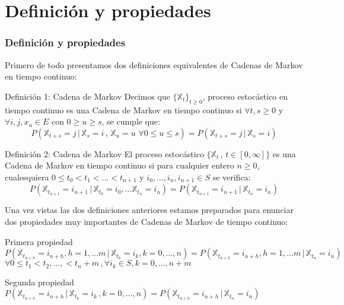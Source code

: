 \documentclass{beamer}
\begin{document}
\section{Definición y propiedades}
\begin{frame}
    \frametitle{Definición y propiedades}
    Primero de todo presentamos dos definiciones equivalentes de Cadenas de Markov en tiempo continuo:
    \newline
    \begin{block}{Definición 1: Cadena de Markov}
Decimos que $\{\mathbb{X}_t\}_{t\geq 0}$, proceso estocástico en tiempo continuo es una Cadena de Markov en tiempo continuo si $\forall t,s\geq 0$ y $\forall i,j,x_u\in E$ con $0\geq u \geq s$, se cumple que:
$$P(\mathbb{X}_{t+s}=j \, | \, \mathbb{X}_s =i \, , \,  \mathbb{X}_u =  u \,\, \forall 0\leq u\leq s)=P(\mathbb{X}_{t+s}=j \, | \, \mathbb{X}_s = i)$$
    \end{block}

\end{frame}
\begin{frame}
    \begin{block}{Definición 2: Cadena de Markov}
    El proceso estocástico $\{\mathbb{X}_t \, , \, t\in [0,\infty]\}$ es una Cadena de Markov en tiempo continuo si para cualquier entero $n\geq 0$, cualesquiera $0\leq t_0 < t_1 < \ldots < t_{n+1}$ y $i_0,\ldots , i_n,i_{n+1}\in S$ se verifica:
$$P(\mathbb{X}_{t_{n+1}}=i_{n+1}\, | \, \mathbb{X}_{t_0}=i_0 , \ldots \mathbb{X}_{t_n}=i_n)=P(\mathbb{X}_{t_{n+1}}=i_{n+1}\, | \, \mathbb{X}_{t_n}=i_n)$$
    \end{block}
\end{frame}

\begin{frame}
Una vez vistas las dos definiciones anteriores estamos preparados para enunciar dos propiedades muy importantes de Cadenas de Markov de tiempo continuo:
\begin{block}{Primera propiedad}
$P(\mathbb{X}_{t_{n+h}}=i_{n+h}, h=1,\ldots m \, | \, \mathbb{X}_{t_k}=i_k, k=0,\ldots ,n)=P(\mathbb{X}_{t_{n+h}}=i_{n+h}, h=1,\ldots m\, |\, \mathbb{X}_{t_n}=i_n )$
\newline\newline
$\forall 0 \leq t_1< t_2, \ldots , < t_n+m\, , \forall i_k\in S, k=0,\ldots , n+m$
\end{block}
\begin{block}{Segunda propiedad}
$P(\mathbb{X}_{t_{n+h}}=i_{n+h}\, | \, \mathbb{X}_{t_k}=i_k \, ,  k=0,\ldots , n)=P(\mathbb{X}_{t_{n+h}}=i_{n+h}\, | \, \mathbb{X}_{t_n}=i_n)$
\end{block}
\end{frame}
\end{document}
